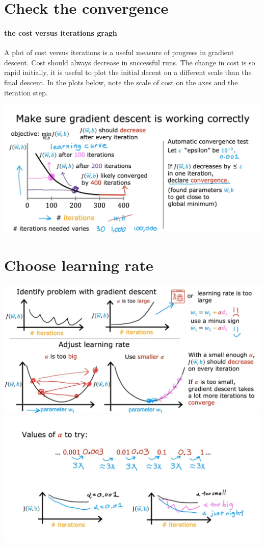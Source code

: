 \section{Check the convergence}
\paragraph*{the cost versus iterations gragh}
A plot of cost versus iterations is a useful measure of %
progress in gradient descent. Cost should always decrease %
in successful runs. The change in cost is so rapid initially, %
it is useful to plot the initial decent on a different scale than the final descent. %
In the plots below, note the scale of cost on the axes and the iteration step.

\includegraphics*[width=\textwidth]{images/2.4 (3)}

\section{Choose learning rate}
\includegraphics*[width=\textwidth]{images/2.4 (2)}
\includegraphics*[width=\textwidth]{images/2.4}

